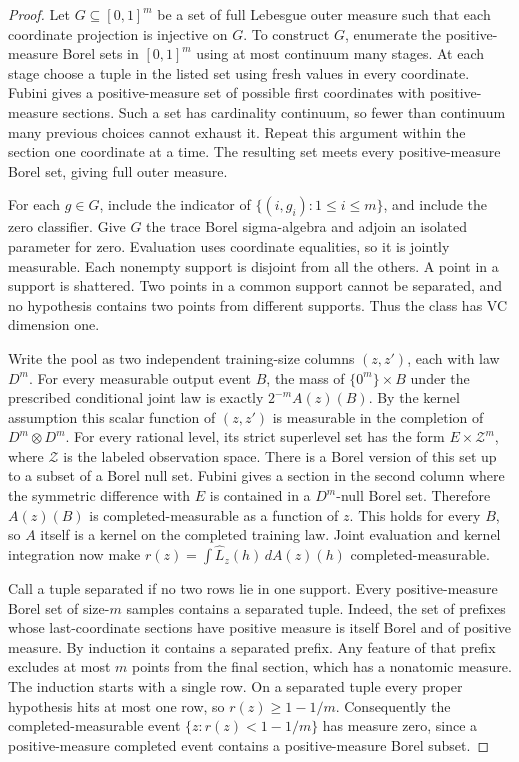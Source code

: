 \documentclass[11pt]{article}
\theoremstyle{definition}\newtheorem{definition}[theorem]{Definition}
\newcommand{\err}{\widehat L}
\begin{document}
\begin{proof}
Let $G\subseteq[0,1]^m$ be a set of full Lebesgue outer measure such that
each coordinate projection is injective on $G$. To construct $G$, enumerate
the positive-measure Borel sets in $[0,1]^m$ using at most continuum many
stages. At each stage choose a tuple in the listed set using fresh values
in every coordinate. Fubini gives a positive-measure set of possible first
coordinates with positive-measure sections. Such a set has cardinality
continuum, so fewer than continuum many previous choices cannot exhaust it.
Repeat this argument within the section one coordinate at a time. The
resulting set meets every positive-measure Borel set, giving full outer
measure.

For each $g\in G$, include the indicator of $\{(i,g_i):1\le i\le m\}$,
and include the zero classifier. Give $G$ the trace Borel sigma-algebra
and adjoin an isolated parameter for zero. Evaluation uses coordinate
equalities, so it is jointly measurable. Each nonempty support is disjoint
from all the others. A point in a support is shattered. Two points in a
common support cannot be separated, and no hypothesis contains two points
from different supports. Thus the class has VC dimension one.

Write the pool as two independent training-size columns $(z,z')$, each
with law $D^m$. For every measurable output event $B$, the mass of
$\{0^m\}\times B$ under the prescribed conditional joint law is exactly
$2^{-m}A(z)(B)$. By the kernel assumption this scalar function of
$(z,z')$ is measurable in the completion of $D^m\otimes D^m$. For every
rational level, its strict superlevel set has the form $E\times\mathcal Z^m$,
where $\mathcal Z$ is the labeled observation space. There is a Borel version
of this set up to a subset of a Borel null set. Fubini gives a section in
the second column where the symmetric difference with $E$ is contained in
a $D^m$-null Borel set. Therefore $A(z)(B)$ is completed-measurable as a
function of $z$. This holds for every $B$, so $A$ itself is a kernel on the
completed training law. Joint evaluation and kernel integration now make
$r(z)=\int\err_z(h)\,dA(z)(h)$ completed-measurable.

Call a tuple separated if no two rows lie in one support. Every
positive-measure Borel set of size-$m$ samples contains a separated tuple.
Indeed, the set of prefixes whose last-coordinate sections have positive
measure is itself Borel and of positive measure. By induction it contains
a separated prefix. Any feature of that prefix excludes at most $m$ points
from the final section, which has a nonatomic measure. The induction
starts with a single row. On a separated tuple every proper hypothesis
hits at most one row, so $r(z)\ge1-1/m$. Consequently the
completed-measurable event $\{z:r(z)<1-1/m\}$ has measure zero, since a
positive-measure completed event contains a positive-measure Borel subset.


\end{proof}
\end{document}
